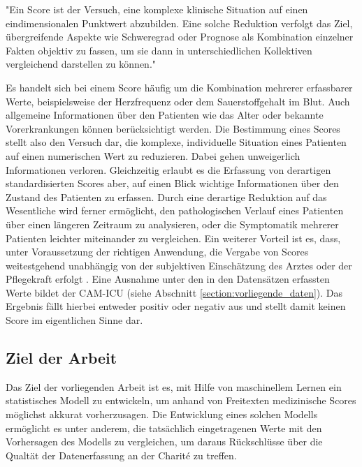 \begin{itquote}
    "Ein Score ist der Versuch, eine komplexe klinische Situation auf einen eindimensionalen Punktwert abzubilden. Eine solche Reduktion verfolgt das Ziel, übergreifende Aspekte wie Schweregrad oder Prognose als Kombination einzelner Fakten objektiv zu fassen, um sie dann in unterschiedlichen Kollektiven vergleichend darstellen zu können."
\end{itquote}

Es handelt sich bei einem Score häufig um die Kombination mehrerer erfassbarer Werte, beispielsweise der Herzfrequenz oder dem Sauerstoffgehalt im Blut. Auch allgemeine Informationen über den Patienten wie das Alter oder bekannte Vorerkrankungen können berücksichtigt werden. Die Bestimmung eines Scores stellt also den Versuch dar, die komplexe, individuelle Situation eines Patienten auf einen numerischen Wert zu reduzieren. Dabei gehen unweigerlich Informationen verloren. Gleichzeitig erlaubt es die Erfassung von derartigen standardisierten Scores aber, auf einen Blick wichtige Informationen über den Zustand des Patienten zu erfassen. Durch eine derartige Reduktion auf das Wesentliche wird ferner ermöglicht, den pathologischen Verlauf eines Patienten über einen längeren Zeitraum zu analysieren, oder die Symptomatik mehrerer Patienten leichter miteinander zu vergleichen. Ein weiterer Vorteil ist es, dass, unter Voraussetzung der richtigen Anwendung, die Vergabe von Scores weitestgehend unabhängig von der subjektiven Einschätzung des Arztes oder der Pflegekraft erfolgt \citep{marxIntensivmedizin2015c}.
Eine Ausnahme unter den in den Datensätzen erfassten Werte bildet der CAM-ICU (siehe Abschnitt \ref{section:vorliegende_daten}). Das Ergebnis fällt hierbei entweder positiv oder negativ aus und stellt damit keinen Score im eigentlichen Sinne dar.

\subsection{Ziel der Arbeit}
Das Ziel der vorliegenden Arbeit ist es, mit Hilfe von maschinellem Lernen ein statistisches Modell zu entwickeln, um anhand von Freitexten medizinische Scores möglichst akkurat vorherzusagen. Die Entwicklung eines solchen Modells ermöglicht es unter anderem, die tatsächlich eingetragenen Werte mit den Vorhersagen des Modells zu vergleichen, um daraus Rückschlüsse über die Qualtät der Datenerfassung an der Charité zu treffen.

